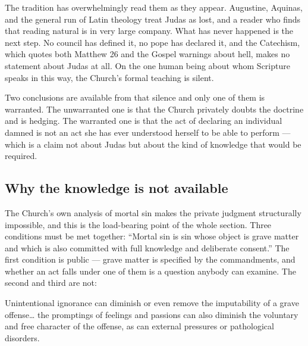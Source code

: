 The tradition has overwhelmingly read them as they appear. Augustine, Aquinas, and the general run of Latin theology treat Judas as lost, and a reader who finds that reading natural is in very large company. What has never happened is the next step. No council has defined it, no pope has declared it, and the Catechism, which quotes both Matthew 26 and the Gospel warnings about hell, makes no statement about Judas at all. On the one human being about whom Scripture speaks in this way, the Church's formal teaching is silent.

Two conclusions are available from that silence and only one of them is warranted. The unwarranted one is that the Church privately doubts the doctrine and is hedging. The warranted one is that the act of declaring an individual damned is not an act she has ever understood herself to be able to perform --- which is a claim not about Judas but about the kind of knowledge that would be required.

\subsection{Why the knowledge is not available}

The Church's own analysis of mortal sin makes the private judgment structurally impossible, and this is the load-bearing point of the whole section. Three conditions must be met together: ``Mortal sin is sin whose object is grave matter and which is also committed with full knowledge and deliberate consent.'' The first condition is public --- grave matter is specified by the commandments, and whether an act falls under one of them is a question anybody can examine. The second and third are not:

\begin{studyframe}
Unintentional ignorance can diminish or even remove the imputability of a grave offense\ldots{} the promptings of feelings and passions can also diminish the voluntary and free character of the offense, as can external pressures or pathological disorders.
\end{studyframe}

